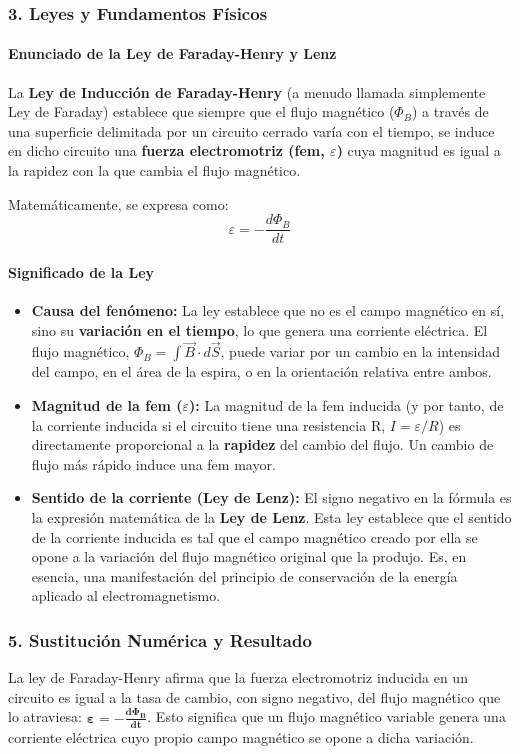 \subsubsection*{3. Leyes y Fundamentos Físicos}
\paragraph*{Enunciado de la Ley de Faraday-Henry y Lenz}
La \textbf{Ley de Inducción de Faraday-Henry} (a menudo llamada simplemente Ley de Faraday) establece que siempre que el flujo magnético ($\Phi_B$) a través de una superficie delimitada por un circuito cerrado varía con el tiempo, se induce en dicho circuito una \textbf{fuerza electromotriz (fem, $\varepsilon$)} cuya magnitud es igual a la rapidez con la que cambia el flujo magnético.

Matemáticamente, se expresa como:
$$ \varepsilon = - \frac{d\Phi_B}{dt} $$

\paragraph*{Significado de la Ley}
\begin{itemize}
    \item \textbf{Causa del fenómeno:} La ley establece que no es el campo magnético en sí, sino su \textbf{variación en el tiempo}, lo que genera una corriente eléctrica. El flujo magnético, $\Phi_B = \int \vec{B} \cdot d\vec{S}$, puede variar por un cambio en la intensidad del campo, en el área de la espira, o en la orientación relativa entre ambos.
    \item \textbf{Magnitud de la fem ($\varepsilon$):} La magnitud de la fem inducida (y por tanto, de la corriente inducida si el circuito tiene una resistencia R, $I = \varepsilon/R$) es directamente proporcional a la \textbf{rapidez} del cambio del flujo. Un cambio de flujo más rápido induce una fem mayor.
    \item \textbf{Sentido de la corriente (Ley de Lenz):} El signo negativo en la fórmula es la expresión matemática de la \textbf{Ley de Lenz}. Esta ley establece que el sentido de la corriente inducida es tal que el campo magnético creado por ella se opone a la variación del flujo magnético original que la produjo. Es, en esencia, una manifestación del principio de conservación de la energía aplicado al electromagnetismo.
\end{itemize}

\subsubsection*{5. Sustitución Numérica y Resultado}
\begin{cajaresultado}
La ley de Faraday-Henry afirma que la fuerza electromotriz inducida en un circuito es igual a la tasa de cambio, con signo negativo, del flujo magnético que lo atraviesa: $\boldsymbol{\varepsilon = - \frac{d\Phi_B}{dt}}$. Esto significa que un flujo magnético variable genera una corriente eléctrica cuyo propio campo magnético se opone a dicha variación.
\end{cajaresultado}

